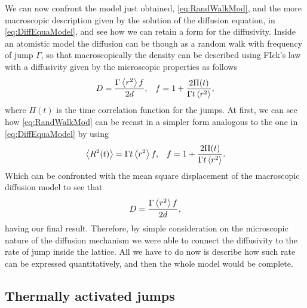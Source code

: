 We can now confront the model just obtained, \eqref{eq:RandWalkMod}, and the more macroscopic description given by the solution of the diffusion equation, in \eqref{eq:DiffEquaModel}, and see how we can retain a form for the diffusivity.
{
    Inside an atomistic model the diffusion can be though as a random walk with frequency of jump $\Gamma$, so that macroscopically the density can be described using FIck's law with a diffusivity given by the microscopic properties as follows 
    \begin{align}
        &D = \frac{\Gamma\left\langle r^2 \right\rangle f}{2d}, &f = 1 + \frac{2\Pi(t)}{\Gamma t\left\langle r^2 \right\rangle},
    \end{align}
    where $\Pi(t)$ is the time correlation function for the jumps.
}
{
    At first, we can see how \eqref{eq:RandWalkMod} can be recast in a simpler form analogous to the one in \eqref{eq:DiffEquaModel} by using
    \begin{align}
        &\left\langle R^2(t) \right\rangle = \Gamma t\left\langle r^2 \right\rangle f, &f = 1 + \frac{2\Pi(t)}{\Gamma t\left\langle r^2 \right\rangle}.
    \end{align}
    Which can be confronted with the mean square displacement of the macroscopic diffusion model to see that
    \begin{equation}
        D = \frac{\Gamma\left\langle r^2 \right\rangle f}{2d},
    \end{equation}
    having our final result.
}
\noindent
Therefore, by simple consideration on the microscopic nature of the diffusion mechanism we were able to connect the diffusivity to the rate of jump inside the lattice. All we have to do now is describe how such rate can be expressed quantitatively, and then the whole model would be complete.

\subsection{Thermally activated jumps}

